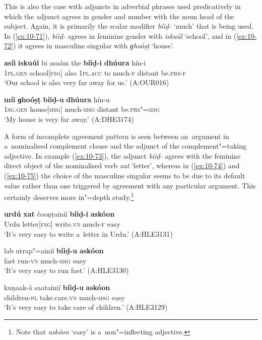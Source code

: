 This is also the case with adjuncts in adverbial phrases used predicatively in which the adjunct agrees in gender and number with the noun head of the subject. Again, it is primarily the scalar modifier \textit{bíiḍ-} `much' that is being used. In (\ref{ex:10-71}), \textit{bíiḍ-} agrees in feminine gender with \textit{iskuúl} `school', and in (\ref{ex:10-72}) it agrees in masculine singular with \textit{ɡhoóṣṭ} `house'. 

\begin{exe}
\ex
\label{ex:10-71}
\gll {\ob}\textbf{asíi} \textbf{iskuúl}{\cb} bi asaám the {\ob}\textbf{bíiḍ-i} \textbf{dhúura}{\cb} hín-i \\
\textsc{1pl.gen} school[\textsc{fsg}] also \textsc{1pl.acc} to much-\textsc{f} distant be.\textsc{prs-f}  \\
\glt `Our school is also very far away for us.' (A:OUR016)

\ex
\label{ex:10-72}
\gll {\ob}\textbf{míi} \textbf{ɡhoóṣṭ}{\cb} {\ob}\textbf{bíiḍ-u} \textbf{dhúura}{\cb} hín-u \\
\textsc{1sg.gen} house[\textsc{msg}] much-\textsc{msg} distant be.\textsc{prs"=msg}  \\
\glt `My house is very far away.' (A:DHE3174)
\end{exe}

A form of incomplete agreement pattern is seen between an~argument in a~nominalised complement clause and the adjunct of the complement"=taking adjective. In example (\ref{ex:10-73}), the adjunct \textit{bíiḍ-} agrees with the feminine direct object of the nominalised verb \textit{xat} `letter', whereas in (\ref{ex:10-74}) and (\ref{ex:10-75}) the choice of the masculine singular seems to be due to its default value rather than one triggered by agreement with any particular argument. This certainly deserves more in"=depth study.\footnote{Note that \textit{askóon} `easy' is a~non"=inflecting adjective.}

\begin{exe}
\ex
\label{ex:10-73}
\gll {\ob}\textbf{urdú} \textbf{xat}{\cb} čooṇṭainií {\ob}\textbf{bíiḍ-i} \textbf{askóon}{\cb} \\
Urdu letter[\textsc{fsg}] write.\textsc{vn} much-\textsc{f} easy  \\
\glt `It's very easy to write a~letter in Urdu.' (A:HLE3131)

\ex
\label{ex:10-74}
\gll lab utrap"=ainií {\ob}\textbf{bíiḍ-u} \textbf{askóon}{\cb} \\
fast run-\textsc{vn} much-\textsc{msg} easy \\
\glt `It's very easy to run fast.' (A:HLE3130)

\ex
\label{ex:10-75}
\gll kuṇaak-á saatainií {\ob}\textbf{bíiḍ-u} \textbf{askóon}{\cb} \\
children-\textsc{pl} take.care.\textsc{vn} much-\textsc{msg} easy \\
\glt `It's very easy to take care of children.' (A:HLE3129)
\end{exe}

